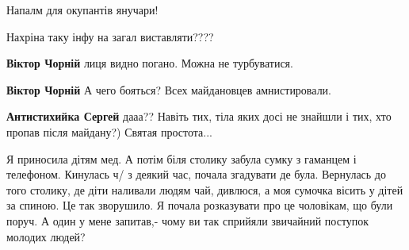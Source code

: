  
 
 
 
 

Напалм для окупантів янучари!

Нахріна таку інфу на загал виставляти????

\begin{itemize} %
\textbf{Віктор Чорній} лиця видно погано. Можна не турбуватися.

\textbf{Віктор Чорній} А чего бояться? Всех майдановцев амнистировали.

\textbf{Антистихийка Сергей} дааа?? Навіть тих, тіла яких досі не знайшли і тих, хто пропав після майдану?)
Святая простота...
\end{itemize} %


Я приносила дітям мед. А потім біля столику забула сумку з гаманцем і
телефоном. Кинулась ч/ з деякий час, почала згадувати де була. Вернулась до
того столику, де діти наливали людям чай, дивлюся, а моя сумочка вісить у дітей
за спиною. Це так зворушило. Я почала розказувати про це чоловікам, що були
поруч. А один у мене запитав,- чому ви так сприйяли звичайний поступок молодих
людей?
